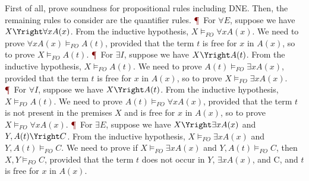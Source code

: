 First of all, prove soundness for propositional rules including DNE. Then, the remaining rules to consider are the quantifier rules. \textcolor{Maroon}{\P}\
For $\forall E$, suppose we have $X \Yright \forall x A(x)$. From the inductive hypothesis, $X \vDash_{FO} \forall x A(x)$. We need to prove $\forall x A(x) \vDash_{FO} A(t)$, provided that the term $t$ is free for $x$ in $A(x)$, so to prove $X \vDash_{FO} A(t)$. \textcolor{Maroon}{\P}\
For $\exists I$, suppose we have $X \Yright A(t)$. From the inductive hypothesis, $X \vDash_{FO} A(t)$. We need to prove $A(t) \vDash_{FO} \exists x A(x)$, provided that the term $t$ is free for $x$ in $A(x)$, so to prove $X \vDash_{FO} \exists x A(x)$. \textcolor{Maroon}{\P}\
For $\forall I$, suppose we have $X \Yright A(t)$. From the inductive hypothesis, $X \vDash_{FO} A(t)$. We need to prove $A(t) \vDash_{FO} \forall x A(x)$, provided that the term $t$ is not present in the premises $X$ and is free for $x$ in $A(x)$, so to prove $X \vDash_{FO} \forall x A(x)$. \textcolor{Maroon}{\P}\
For $\exists E$, suppose we have $X \Yright \exists x A(x)$ and $Y, A(t) \Yright C$. From the inductive hypothesis, $X \vDash_{FO} \exists x A(x)$ and $Y, A(t) \vDash_{FO} C$. We need to prove if $X \vDash_{FO} \exists x A(x)$ and $Y, A(t) \vDash_{FO} C$, then $X,Y \vDash_{FO} C$, provided that the term $t$ does not occur in $Y$, $\exists x A(x)$, and C, and $t$ is free for $x$ in $A(x)$.
